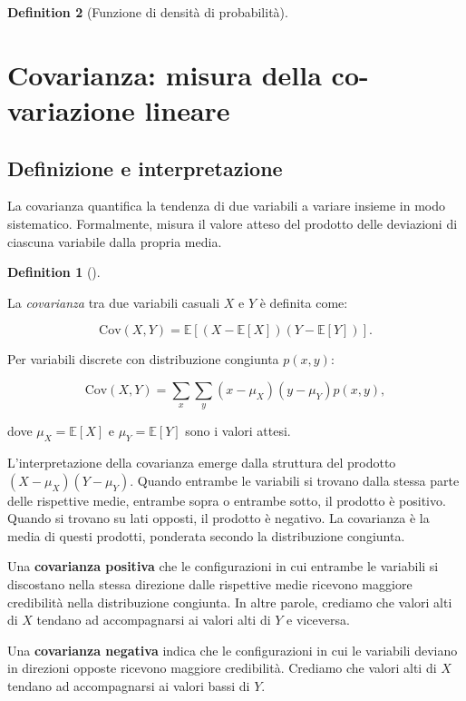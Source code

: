 \documentclass[
  letterpaper,
  DIV=11,
  numbers=noendperiod,
  oneside]{scrreprt}
\theoremstyle{definition}
\theoremstyle{plain}
\theoremstyle{definition}
\newtheorem{definition}{Definition}[chapter]
\theoremstyle{remark}
\begin{document}
\begin{definition}[Funzione di densità di
probabilità]
\section{Covarianza: misura della co-variazione
lineare}\label{covarianza-misura-della-co-variazione-lineare}

\subsection{Definizione e
interpretazione}\label{definizione-e-interpretazione}

La covarianza quantifica la tendenza di due variabili a variare insieme
in modo sistematico. Formalmente, misura il valore atteso del prodotto
delle deviazioni di ciascuna variabile dalla propria media.

\begin{definition}[]\protect\hypertarget{def-covariance}{}\label{def-covariance}

La \emph{covarianza} tra due variabili casuali \(X\) e \(Y\) è definita
come:

\[
\text{Cov}(X, Y) = \mathbb{E}\left[(X - \mathbb{E}[X])(Y - \mathbb{E}[Y])\right].
\]

Per variabili discrete con distribuzione congiunta \(p(x,y)\):

\[
\text{Cov}(X, Y) = \sum_{x}\sum_{y}(x - \mu_X)(y - \mu_Y)p(x, y),
\]

dove \(\mu_X = \mathbb{E}[X]\) e \(\mu_Y = \mathbb{E}[Y]\) sono i valori
attesi.

\end{definition}

L'interpretazione della covarianza emerge dalla struttura del prodotto
\((X - \mu_X)(Y - \mu_Y)\). Quando entrambe le variabili si trovano
dalla stessa parte delle rispettive medie, entrambe sopra o entrambe
sotto, il prodotto è positivo. Quando si trovano su lati opposti, il
prodotto è negativo. La covarianza è la media di questi prodotti,
ponderata secondo la distribuzione congiunta.

Una \textbf{covarianza positiva} che le configurazioni in cui entrambe
le variabili si discostano nella stessa direzione dalle rispettive medie
ricevono maggiore credibilità nella distribuzione congiunta. In altre
parole, crediamo che valori alti di \(X\) tendano ad accompagnarsi ai
valori alti di \(Y\) e viceversa.

Una \textbf{covarianza negativa} indica che le configurazioni in cui le
variabili deviano in direzioni opposte ricevono maggiore credibilità.
Crediamo che valori alti di \(X\) tendano ad accompagnarsi ai valori
bassi di \(Y\).


\end{definition}
\end{document}
